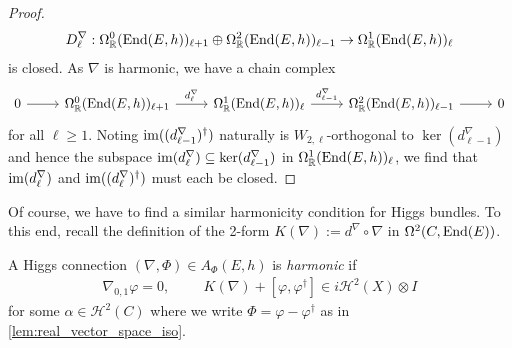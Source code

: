 \documentclass[12pt]{ociamthesis}  %
\begin{document}
\begin{lemma}
\begin{proof}
\begin{align*}
      D^\nabla_\ell :
      \Omega^0_{\mathbb R}(\operatorname{End}(E,h))_{\ell+1}
      \oplus \Omega^2_{\mathbb R}(\operatorname{End}(E,h))_{\ell-1}
      \to \Omega^1_{\mathbb R}(\operatorname{End}(E,h))_\ell
    \end{align*}
    is closed. As $\nabla$ is harmonic, we have a chain complex
    \begin{equation*}
      \begin{tikzcd}
        0 & {\Omega^0_{\mathbb R}(\End(E,h))_{\ell+1}} & {\Omega^1_{\mathbb R}(\End(E,h))_\ell} & {\Omega^2_{\mathbb R}(\End(E,h))_{\ell-1}} & 0
        \arrow[from=1-1, to=1-2]
        \arrow["{d^\nabla_\ell}", from=1-2, to=1-3]
        \arrow["{d^\nabla_{\ell-1}}", from=1-3, to=1-4]
        \arrow[from=1-4, to=1-5]
      \end{tikzcd}
    \end{equation*}
    for all $\ell\geq 1$.
    Noting $\operatorname{im}((d^\nabla_{\ell-1})^\dagger)$
    naturally is $W_{2,\ell}$-orthogonal to $\ker(d^\nabla_{\ell-1})$
    and hence the subspace $\operatorname{im}(d^\nabla_{\ell})\subseteq\ker(d^\nabla_{\ell-1})$
    in $\Omega^1_{\mathbb R}(\operatorname{End}(E,h))_\ell$, we find that
    $\operatorname{im}(d^\nabla_\ell)$ and $\operatorname{im}((d^\nabla_\ell)^\dagger)$ must each be
    closed.
  \end{proof}
\end{lemma}

Of course, we have to find a similar harmonicity condition for
Higgs bundles. To this end, recall the definition
of the 2-form $K(\nabla) := d^\nabla \circ \nabla$
in $\Omega^2(C,\operatorname{End}(E))$.

\begin{definition}
  A Higgs connection $(\nabla,\Phi)\in A_\Phi(E,h)$
  is \emph{harmonic} if
  \begin{align}\label{eq:Hitchin_equations}
    \nabla_{0,1}\varphi = 0,\hspace{1cm}
    K(\nabla) + [\varphi,\varphi^\dagger] \in i\mathcal H^2(X)\otimes I
  \end{align}
  for some $\alpha\in\mathcal H^2(C)$ where we write
  $\Phi = \varphi - \varphi^\dagger$ as in \ref{lem:real_vector_space_iso}.
\end{definition}
\end{document}
